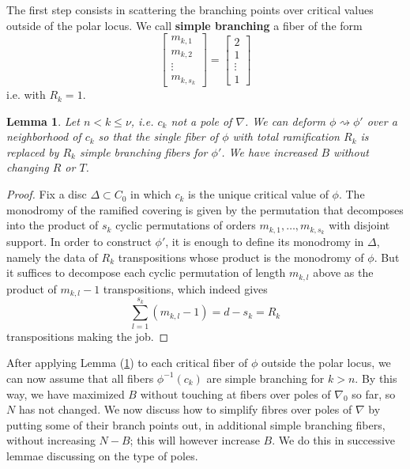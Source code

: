 \documentclass[12]{amsart}
\newtheorem{lem}[thm]{Lemma}
\begin{document}
The first step consists in scattering the branching points over critical values outside of the polar locus. 
We call {\bf simple branching} a fiber of the form 
$$\left[\begin{matrix}m_{k,1}\\ m_{k,2}\\ \vdots\\ m_{k,s_k}\end{matrix}\right]=\left[\begin{matrix}2\\ 1\\ \vdots\\ 1\end{matrix}\right]$$
i.e. with $R_k=1$.

\begin{lem}\label{lem:FibreCritique}
Let $n<k\le\nu$, i.e. $c_k$ not a pole of $\nabla$. 
We can deform $\phi\rightsquigarrow\phi'$ over a neighborhood of $c_k$ so that
the single fiber of $\phi$ with total ramification $R_k$ is replaced by $R_k$ simple branching fibers for $\phi'$.
We have increased $B$ without changing $R$ or $T$.
\end{lem}

\begin{proof}Fix a disc $\Delta\subset C_0$ in which $c_k$ is the unique critical value of $\phi$.
The monodromy of the ramified covering is given by the permutation that decomposes into 
the product of $s_k$ cyclic permutations of orders $m_{k,1},\ldots,m_{k,s_k}$ with disjoint support.
In order to construct $\phi'$, it is enough to define its monodromy in $\Delta$, 
namely the data of $R_k$ transpositions whose product is the monodromy of $\phi$.
But it suffices to decompose each cyclic permutation of length $m_{k,l}$ above as the product of 
$m_{k,l}-1$ transpositions, which indeed gives 
$$\sum_{l=1}^{s_k}(m_{k,l}-1)=d-s_k=R_k$$
transpositions making the job.
\end{proof}

After applying Lemma (\ref{lem:FibreCritique}) to each critical fiber of $\phi$ outside the polar locus, 
we can now assume that all fibers $\phi^{-1}(c_k)$ are simple branching for $k>n$. By this way, 
we have maximized $B$ without touching at fibers over poles of $\nabla_0$ so far, so $N$ has not changed.
We now discuss how to simplify fibres over poles of $\nabla$ by putting some of their branch points out,
in additional simple branching fibers, without increasing $N-B$; this will however increase $B$.
We do this in successive lemmae discussing on the type of poles.
\end{document}
